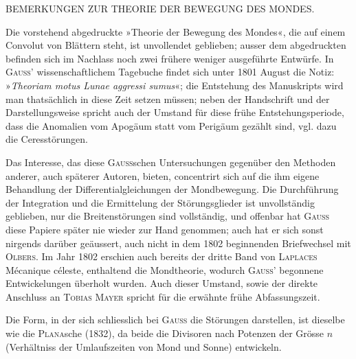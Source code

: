 \clearpage
\begingroup
\fancyhead{}
\renewcommand{\headrulewidth}{0pt}
\begin{center}BEMERKUNGEN ZUR THEORIE DER BEWEGUNG DES MONDES.\end{center}
\small

\par\noindent\hspace*{\parindent}Die vorstehend abgedruckte »Theorie der Bewegung des Mondes«, die auf einem Convolut von
Blättern steht, ist unvollendet geblieben; ausser dem abgedruckten befinden sich im Nachlass noch zwei
frühere weniger ausgeführte Entwürfe. In \textsc{Gauss}’ wissenschaftlichem Tagebuche findet sich unter 1801
August die Notiz: »\textit{Theoriam motus Lunae aggressi sumus}«; die Entstehung des Manuskripts wird man
thatsächlich in diese Zeit setzen müssen; neben der Handschrift und der Darstellungsweise spricht auch der
Umstand für diese frühe Entstehungsperiode, dass die Anomalien vom Apogäum statt vom Perigäum gezählt
sind, vgl. dazu die Ceresstörungen.

\par\noindent\hspace*{\parindent}Das Interesse, das diese \textsc{Gauss}schen Untersuchungen gegenüber den Methoden anderer, auch späterer
Autoren, bieten, concentrirt sich auf die ihm eigene Behandlung der Differentialgleichungen der Mondbewegung.
Die Durchführung der Integration und die Ermittelung der Störungsglieder ist unvollständig
geblieben, nur die Breitenstörungen sind vollständig, und offenbar hat \textsc{Gauss} diese Papiere später nie
wieder zur Hand genommen; auch hat er sich sonst nirgends darüber geäussert, auch nicht in dem 1802
beginnenden Briefwechsel mit \textsc{Olbers}. Im Jahr 1802 erschien auch bereits der dritte Band von \textsc{Laplaces}
Mécanique céleste, enthaltend die Mondtheorie, wodurch \textsc{Gauss}’ begonnene Entwickelungen überholt
wurden. Auch dieser Umstand, sowie der direkte Anschluss an \textsc{Tobias Mayer} spricht für die erwähnte
frühe Abfassungszeit.

\par\noindent\hspace*{\parindent}Die Form, in der sich schliesslich bei \textsc{Gauss} die Störungen darstellen, ist dieselbe wie die \textsc{Plana}sche
(1832), da beide die Divisoren nach Potenzen der Grösse \(n\) (Verhältniss der Umlaufszeiten von Mond und
Sonne) entwickeln.

